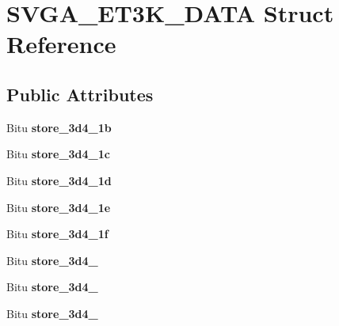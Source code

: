 \hypertarget{structSVGA__ET3K__DATA}{\section{S\-V\-G\-A\-\_\-\-E\-T3\-K\-\_\-\-D\-A\-T\-A Struct Reference}
\label{structSVGA__ET3K__DATA}
}
\subsection*{Public Attributes}
\begin{DoxyCompactItemize}
\item 
\hypertarget{structSVGA__ET3K__DATA_a50644520ad6edc81175028a180a86cf7}{Bitu {\bfseries store\-\_\-3d4\-\_\-1b}}\label{structSVGA__ET3K__DATA_a50644520ad6edc81175028a180a86cf7}

\item 
\hypertarget{structSVGA__ET3K__DATA_a59fcaf6374bf2acdbfb472f0cac7882d}{Bitu {\bfseries store\-\_\-3d4\-\_\-1c}}\label{structSVGA__ET3K__DATA_a59fcaf6374bf2acdbfb472f0cac7882d}

\item 
\hypertarget{structSVGA__ET3K__DATA_aa8e8bc3bdb3c72eb16c876e544a7a5ac}{Bitu {\bfseries store\-\_\-3d4\-\_\-1d}}\label{structSVGA__ET3K__DATA_aa8e8bc3bdb3c72eb16c876e544a7a5ac}

\item 
\hypertarget{structSVGA__ET3K__DATA_a5fbc114a6a63242dfe1b1d15b6ddd193}{Bitu {\bfseries store\-\_\-3d4\-\_\-1e}}\label{structSVGA__ET3K__DATA_a5fbc114a6a63242dfe1b1d15b6ddd193}

\item 
\hypertarget{structSVGA__ET3K__DATA_a577658d7ab36c245dc4910cb02332757}{Bitu {\bfseries store\-\_\-3d4\-\_\-1f}}\label{structSVGA__ET3K__DATA_a577658d7ab36c245dc4910cb02332757}

\item 
\hypertarget{structSVGA__ET3K__DATA_adef19ad2ebd450311b33c38fb7c575a6}{Bitu {\bfseries store\-\_\-3d4\-\_}}\label{structSVGA__ET3K__DATA_adef19ad2ebd450311b33c38fb7c575a6}

\item 
\hypertarget{structSVGA__ET3K__DATA_a6b8de66d1d4930e8ca2d9b94106ca26c}{Bitu {\bfseries store\-\_\-3d4\-\_}}\label{structSVGA__ET3K__DATA_a6b8de66d1d4930e8ca2d9b94106ca26c}

\item 
\hypertarget{structSVGA__ET3K__DATA_aead1bfb6166a223d950c4e3229f01adc}{Bitu {\bfseries store\-\_\-3d4\-\_}}\label{structSVGA__ET3K__DATA_aead1bfb6166a223d950c4e3229f01adc}


\end{DoxyCompactItemize}
